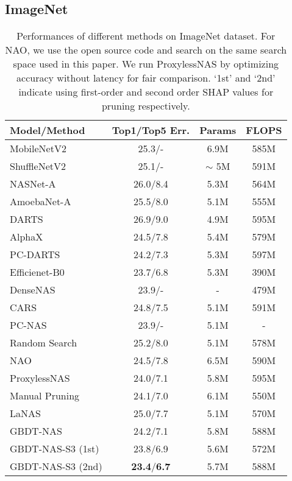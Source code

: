 \documentclass{article}
\begin{document}
\subsection{ImageNet}
\begin{table}[htbp]
\centering
\small
\begin{tabular}{lccc}
\toprule
Model/Method                      & Top1/Top5 Err. & Params & FLOPS \\ 
\midrule
MobileNetV2~\cite{mobilenetv2}     & 25.3/-        & 6.9M  & 585M \\
ShuffleNetV2~\cite{shufflenet}  & 25.1/-  & $\sim$ 5M & 591M  \\
\midrule
NASNet-A~\cite{nas}               & 26.0/8.4  & 5.3M      & 564M \\
AmoebaNet-A~\cite{amoebanet}      & 25.5/8.0  & 5.1M      & 555M \\
DARTS~\cite{darts}                & 26.9/9.0  & 4.9M      & 595M \\
AlphaX~\cite{mctsnas}            & 24.5/7.8  & 5.4M      & 579M\\
PC-DARTS~\cite{pcdarts}           & 24.2/7.3  & 5.3M      & 597M\\
Efficienet-B0~\cite{efficientnet} & 23.7/6.8 & 5.3M      & 390M \\
DenseNAS~\cite{densenas}          & 23.9/-   & -         & 479M \\
CARS~\cite{cars}                  & 24.8/7.5 & 5.1M      & 591M \\
PC-NAS~\cite{pcnas}               & 23.9/-   & 5.1M      & - \\
\midrule
Random Search                    & 25.2/8.0     & 5.1M   & 578M \\
NAO~\cite{nao}                   & 24.5/7.8     & 6.5M   & 590M \\
ProxylessNAS~\cite{proxylessnas}  & 24.0/7.1     & 5.8M   & 595M\\
Manual Pruning                  & 24.1/7.0     & 6.1M   & 550M \\
LaNAS~\cite{lanas}            & 25.0/7.7       & 5.1M   & 570M \\
\midrule 
GBDT-NAS                      & 24.2/7.1   & 5.8M      & 588M \\
GBDT-NAS-S3 (1st)   & 23.8/6.9   & 5.6M      & 572M \\
GBDT-NAS-S3 (2nd)  & \textbf{23.4}/\textbf{6.7} & 5.7M & 588M \\
\bottomrule
\end{tabular}
\caption{Performances of different methods on ImageNet dataset. For NAO, we use the open source code and search on the same search space used in this paper. We run ProxylessNAS by optimizing accuracy without latency for fair comparison. `1st' and `2nd' indicate using first-order and second order SHAP values for pruning respectively.}
\label{tbl:ImageNet}
\end{table}
\end{document}
